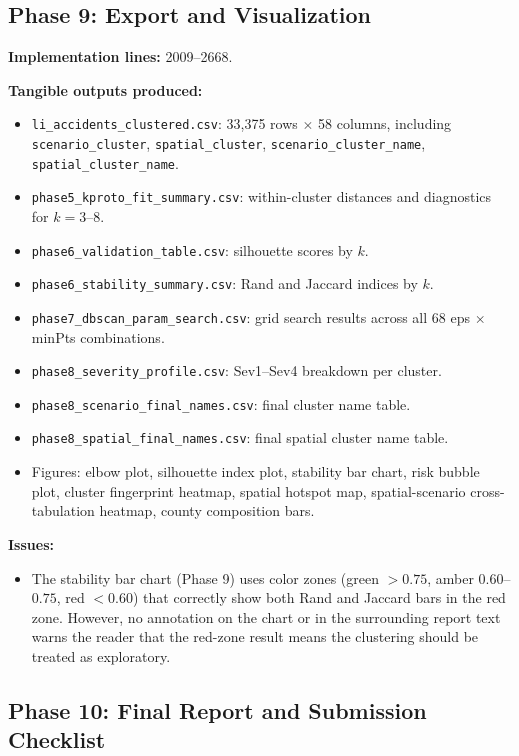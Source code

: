 \documentclass[11pt]{article}
\begin{document}
\subsection{Phase 9: Export and Visualization}

\textbf{Implementation lines:} 2009--2668.

\textbf{Tangible outputs produced:}

\begin{itemize}
\item \texttt{li\_accidents\_clustered.csv}: 33{,}375 rows $\times$ 58 columns,
  including \texttt{scenario\_cluster}, \texttt{spatial\_cluster},
  \texttt{scenario\_cluster\_name}, \texttt{spatial\_cluster\_name}.
\item \texttt{phase5\_kproto\_fit\_summary.csv}: within-cluster distances and
  diagnostics for $k = 3$--$8$.
\item \texttt{phase6\_validation\_table.csv}: silhouette scores by $k$.
\item \texttt{phase6\_stability\_summary.csv}: Rand and Jaccard indices by $k$.
\item \texttt{phase7\_dbscan\_param\_search.csv}: grid search results across
  all 68 eps $\times$ minPts combinations.
\item \texttt{phase8\_severity\_profile.csv}: Sev1--Sev4 breakdown per cluster.
\item \texttt{phase8\_scenario\_final\_names.csv}: final cluster name table.
\item \texttt{phase8\_spatial\_final\_names.csv}: final spatial cluster name table.
\item Figures: elbow plot, silhouette index plot, stability bar chart,
  risk bubble plot, cluster fingerprint heatmap, spatial hotspot map,
  spatial-scenario cross-tabulation heatmap, county composition bars.
\end{itemize}

\textbf{Issues:}
\begin{itemize}
\item The stability bar chart (Phase 9) uses color zones (green $> 0.75$, amber
  $0.60$--$0.75$, red $< 0.60$) that correctly show both Rand and Jaccard bars
  in the red zone. However, no annotation on the chart or in the surrounding
  report text warns the reader that the red-zone result means the clustering
  should be treated as exploratory.
\end{itemize}

\subsection{Phase 10: Final Report and Submission Checklist}
\end{document}
